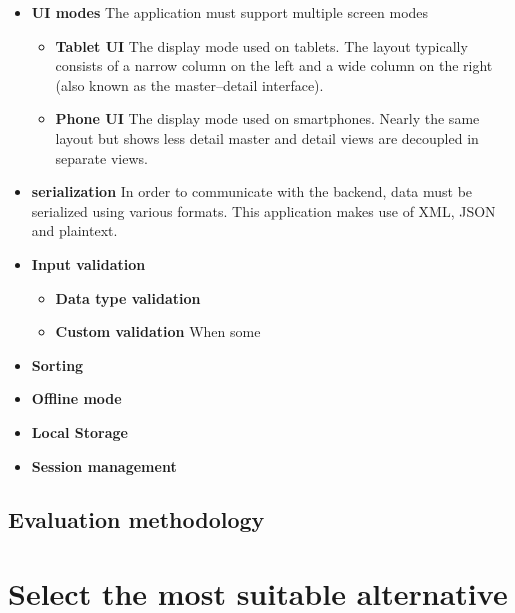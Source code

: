 \begin{itemize}
\begin{itemize}
    \end{itemize}
    \item \textbf{UI modes} The application must support multiple screen modes
    \begin{itemize}
        \item \textbf{Tablet UI} The display mode used on tablets. The layout typically consists of a narrow column on the left and a wide column on the right (also known as the master--detail interface).
        \item \textbf{Phone UI} The display mode used on smartphones. Nearly the same layout but shows less detail master and detail views are decoupled in separate views.
    \end{itemize}
    \item \textbf{serialization} In order to communicate with the backend,  data must be serialized using various formats. This application makes use of XML, JSON and plaintext.
    \item \textbf{Input validation}
    \begin{itemize}
        \item \textbf{Data type validation} 
        \item \textbf{Custom validation} When some  
    \end{itemize}
    \item \textbf{Sorting}
    \item \textbf{Offline mode}
    \item \textbf{Local Storage}
    \item \textbf{Session management}
\end{itemize}









\subsection{Evaluation methodology}
\label{sec:evaluation-method}


\section{Select the most suitable alternative}













